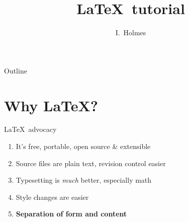 \documentclass{beamer}
\title{\LaTeX~tutorial}
\author{I.~Holmes}
\institute{
  Department of Bioengineering\\
  University of California, Berkeley}
\begin{document}
\begin{frame}
  \titlepage
\end{frame}

\begin{frame}{Outline}
  \tableofcontents
\end{frame}

\section{Why \LaTeX?}

\begin{frame}{\LaTeX~advocacy}
  \begin{enumerate}
    \item It's free, portable, open source \& extensible
    \item Source files are plain text, revision control easier
    \item Typesetting is {\em much} better, especially math
    \item Style changes are easier
    \item {\bf Separation of form and content}
  \end{enumerate}
\end{frame}
\end{document}
